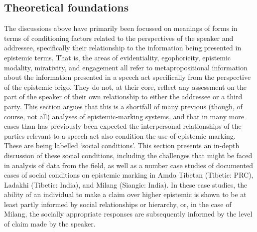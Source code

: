 \subsection{Theoretical foundations}
The discussions above have primarily been focussed on meanings of forms in terms of conditioning factors related to the perspectives of the speaker and addressee, specifically their relationship to the information being presented in epistemic terms. That is, the areas of evidentiality, egophoricity, epistemic modality, mirativity, and engagement all refer to metapropositional information about the information presented in a speech act specifically from the perspective of the epistemic origo. They do not, at their core, reflect any assessment on the part of the speaker of their own relationship to either the addressee or a third party. This section argues that this is a shortfall of many previous (though, of course, not all) analyses of epistemic-marking systems, and that in many more cases than has previously been expected the interpersonal relationships of the parties relevant to a speech act also condition the use of epistemic marking. These are being labelled `social conditions'. This section presents an in-depth discussion of these social conditions, including the challenges that might be faced in analysis of data from the field, as well as a number case studies of documented cases of social conditions on epistemic marking in Amdo Tibetan (Tibetic: PRC), Ladakhi (Tibetic: India), and Milang (Siangic: India). In these case studies, the ability of an individual to make a claim over higher epistemic is shown to be at least partly informed by social relationships or hierarchy, or, in the case of Milang, the socially appropriate responses are subsequently informed by the level of claim made by the speaker.


